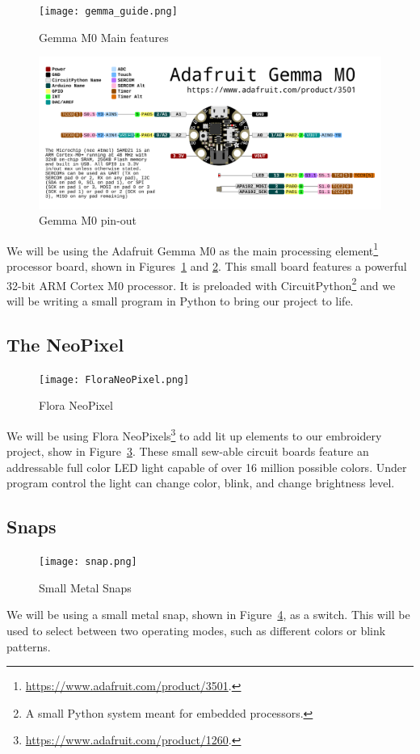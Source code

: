 \documentclass[letterpaper,twoside,12pt]{article}
\begin{document}
\begin{figure}[hbpt]\begin{centering}%
\texttt{[image: gemma\_guide.png]}
\caption{Gemma M0 Main features}
\label{fig:gemmaguide}
\end{centering}\end{figure}
\begin{figure}[hbpt]\begin{centering}%
\includegraphics[width=5in]{adafruit_gemma_Adafruit_GEMMA_M0_pinout.png}
\caption{Gemma M0 pin-out}
\label{fig:gemmapinout}
\end{centering}\end{figure}
We will be using the Adafruit Gemma M0 as the main processing element\footnote{
\url{https://www.adafruit.com/product/3501}.} processor board, shown in
Figures~\ref{fig:gemmaguide} and \ref{fig:gemmapinout}. This small board
features a powerful 32-bit ARM Cortex M0 processor. It is preloaded with
CircuitPython\footnote{A small Python system meant for embedded processors.} 
and we will be writing a small program in Python to bring our project to life.
\clearpage
\subsection{The NeoPixel}
\begin{figure}[hbpt]\begin{centering}%
\texttt{[image: FloraNeoPixel.png]}
\caption{Flora NeoPixel}
\label{fig:floraneopixel}
\end{centering}\end{figure}
We will be using Flora
NeoPixels\footnote{\url{https://www.adafruit.com/product/1260}.} to add lit up
elements to our embroidery project, show in Figure~\ref{fig:floraneopixel}.
These small sew-able circuit boards feature an addressable full color LED light
capable of over 16 million possible colors.  Under program control the light 
can change color, blink, and change brightness level.
\clearpage
\subsection{Snaps}
\begin{figure}[hbpt]\begin{centering}%
\texttt{[image: snap.png]}
\caption{Small Metal Snaps}
\label{fig:snaps}
\end{centering}\end{figure}
We will be using a small metal snap, shown in Figure~\ref{fig:snaps}, as a 
switch.  This will be used to select between two operating modes, such as
different colors or blink patterns.
\clearpage
\end{document}
